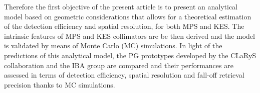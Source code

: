 \documentclass[a4paper,english]{article}
\newcommand{\answ}[1]{\todo[linecolor=blue,backgroundcolor=blue!25,bordercolor=blue]{#1}}
\begin{document}
Therefore the first objective of the present article is to present an analytical model based on geometric considerations that allows for a theoretical estimation of the detection efficiency and spatial resolution, for both MPS and KES. The intrinsic features of MPS and KES collimators are be then derived and the model is validated by means of Monte Carlo (MC) simulations. In light of the predictions of this analytical model, the PG prototypes developed by the CLaRyS collaboration and the IBA group are compared and their performances are assessed in terms of detection efficiency, spatial resolution and fall-off retrieval precision thanks to MC simulations.


%   


\end{document}
